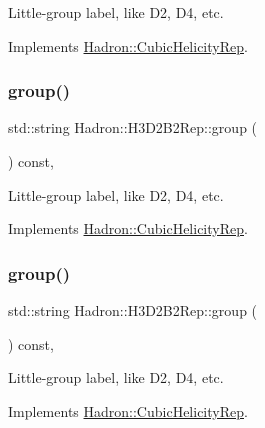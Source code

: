 Little-\/group label, like D2, D4, etc. 

Implements \mbox{\hyperlink{structHadron_1_1CubicHelicityRep_a101a7d76cd8ccdad0f272db44b766113}{Hadron\+::\+Cubic\+Helicity\+Rep}}.

\mbox{\label{structHadron_1_1H3D2B2Rep_a54d96e4bedb375325552d1f5e8149f30}} 
\subsubsection{\texorpdfstring{group()}{group()}\hspace{0.1cm}{\footnotesize\ttfamily [3/5]}}
{\footnotesize\ttfamily std\+::string Hadron\+::\+H3\+D2\+B2\+Rep\+::group (\begin{DoxyParamCaption}{ }\end{DoxyParamCaption}) const\hspace{0.3cm}{\ttfamily [inline]}, {\ttfamily [virtual]}}

Little-\/group label, like D2, D4, etc. 

Implements \mbox{\hyperlink{structHadron_1_1CubicHelicityRep_a101a7d76cd8ccdad0f272db44b766113}{Hadron\+::\+Cubic\+Helicity\+Rep}}.

\mbox{\label{structHadron_1_1H3D2B2Rep_a54d96e4bedb375325552d1f5e8149f30}} 
\subsubsection{\texorpdfstring{group()}{group()}\hspace{0.1cm}{\footnotesize\ttfamily [4/5]}}
{\footnotesize\ttfamily std\+::string Hadron\+::\+H3\+D2\+B2\+Rep\+::group (\begin{DoxyParamCaption}{ }\end{DoxyParamCaption}) const\hspace{0.3cm}{\ttfamily [inline]}, {\ttfamily [virtual]}}

Little-\/group label, like D2, D4, etc. 

Implements \mbox{\hyperlink{structHadron_1_1CubicHelicityRep_a101a7d76cd8ccdad0f272db44b766113}{Hadron\+::\+Cubic\+Helicity\+Rep}}.

\mbox{\label{structHadron_1_1H3D2B2Rep_a54d96e4bedb375325552d1f5e8149f30}} 

